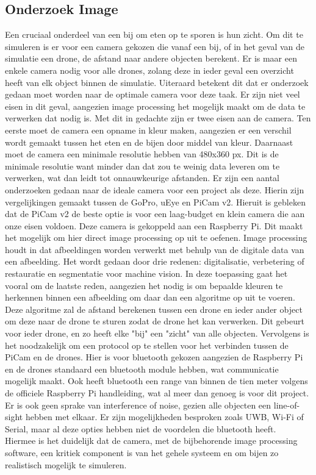 \subsection{Onderzoek Image}
Een cruciaal onderdeel van een bij om eten op te sporen is hun zicht. Om dit te simuleren is er voor een camera gekozen die vanaf een bij, of in het geval van de simulatie een drone, de afstand naar andere objecten berekent. Er is maar een enkele camera nodig voor alle drones, zolang deze in ieder geval een overzicht heeft van elk object binnen de simulatie.
Uiteraard betekent dit dat er onderzoek gedaan moet worden naar de optimale camera voor deze taak. Er zijn niet veel eisen in dit geval, aangezien image processing het mogelijk maakt om de data te verwerken dat nodig is. Met dit in gedachte zijn er twee eisen aan de camera. Ten eerste moet de camera een opname in kleur maken, aangezien er een verschil wordt gemaakt tussen het eten en de bijen door middel van kleur. Daarnaast moet de camera een minimale resolutie hebben van 480x360 px. Dit is de minimale resolutie want minder dan dat zou te weinig data leveren om te verwerken, wat dan leidt tot onnauwkeurige afstanden.
Er zijn een aantal onderzoeken gedaan naar de ideale camera voor een project als deze. Hierin zijn vergelijkingen gemaakt tussen de GoPro, uEye en PiCam v2. Hieruit is gebleken dat de PiCam v2 de beste optie is voor een laag-budget en klein camera die aan onze eisen voldoen.\cite{picamstudies}
Deze camera is gekoppeld aan een Raspberry Pi. Dit maakt het mogelijk om hier direct image processing op uit te oefenen. Image processing houdt in dat afbeeldingen worden verwerkt met behulp van de digitale data van een afbeelding. Het wordt gedaan door drie redenen: digitalisatie, verbetering of restauratie en segmentatie voor machine vision.\cite{imageprocessing} In deze toepassing gaat het vooral om de laatste reden, aangezien het nodig is om bepaalde kleuren te herkennen binnen een afbeelding om daar dan een algoritme op uit te voeren. Deze algoritme zal de afstand berekenen tussen een drone en ieder ander object om deze naar de drone te sturen zodat de drone het kan verwerken. Dit gebeurt voor ieder drone, en zo heeft elke "bij" een "zicht" van alle objecten.
Vervolgens is het noodzakelijk om een protocol op te stellen voor het verbinden tussen de PiCam en de drones. Hier is voor bluetooth gekozen aangezien de Raspberry Pi en de drones standaard een bluetooth module hebben, wat communicatie mogelijk maakt. Ook heeft bluetooth een range van binnen de tien meter volgens de officiele Raspberry Pi handleiding, wat al meer dan genoeg is voor dit project. Er is ook geen sprake van interference of noise, gezien alle objecten een line-of-sight hebben met elkaar. Er zijn mogelijkheden besproken zoals UWB, Wi-Fi of Serial, maar al deze opties hebben niet de voordelen die bluetooth heeft.\\
Hiermee is het duidelijk dat de camera, met de bijbehorende image processing software, een kritiek component is van het gehele systeem en om bijen zo realistisch mogelijk te simuleren.

